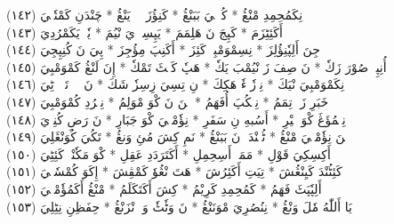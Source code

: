 \documentclass[a4paper, 10pt]{report}
\begin{document}
\begin{center}
\textarabic{(١٤٢) \textcolor{mygreen}{نِكَمُحِمِدِ مْنْڠُ  * كُنٖٹٖيَ بَبَنْڠُ  * كَنِؤُزَ پٖٹٖ يَنْڠُ  * چَنْدَنِ كَمْتٗلٖيَ }} 
\\[5mm] 

\textarabic{(١٤٣) \textcolor{mygreen}{پٖٹٖ أَكَئِٹِزَمَ  * كَپِجَ نَ هَلِمَمَ  * يَپِسِيٖ يَ نْيُمَ  * يٗتٖ يَكَمْرُدِيَ }} 
\\[5mm] 

\textarabic{(١٤٤) \textcolor{mygreen}{جِنَ أَلِپٗنِؤُلِزَ  * نِسِمْوَمْبِيٖ كَئِزَ  * أَكَنِپَ مِؤُجِزَ  * پِيَ نَ كُنِپِجِيَ }} 
\\[5mm] 

\textarabic{(١٤٥) \textcolor{mygreen}{أُنِپِيٖ صُوْرَ زَكٗ  * نَ صِفَ زَ نْيُمْبَ يَكٗ  * هَپٗ كَئٖٹَ تَمْكٗ  * إِنَ لَنْڠُ كَمْوَمْبِيَ }} 
\\[5mm] 

\textarabic{(١٤٦) \textcolor{mygreen}{نِكَمْوَمْبِيَ نْيَكَ  * نِزٖزٗوٖءٗ هَكِكَ  * نِ تِسِيَ زِسِزٗ شَكَ  * نَ وٖوٖ تَرٖهٖ ٹِيَ }} 
\\[5mm] 

\textarabic{(١٤٧) \textcolor{mygreen}{خَبَرِ زَكٖ تِمَمُ  * نِمٖكُپَ أُفَهَمُ  * تٖنَ نَ كْوَ مْوَلِمُ  * نِمٖرُدِ كُمْوَمْبِيَ }} 
\\[5mm] 

\textarabic{(١٤٨) \textcolor{mygreen}{نِمٖمُؤَڠَ كْوَ خٖيْرِ  * أَسُبهِ نِ سَفَرِ  * نِؤٗمْبٖيَ كْوَ جَبَارِ  * نَ رَضِ كُنِوٖيَ }} 
\\[5mm] 

\textarabic{(١٤٩) \textcolor{mygreen}{تٖنَ نِؤٗمْبٖيَ مْنْڠُ  * ٹُپٖنْدَنٖ نَ بَبَنْڠُ  * نَمِ كِشَ مُئِ وَنڠُ  * تَكُيَ كُوَنْڠَلِيَ }} 
\\[5mm] 

\textarabic{(١٥٠) \textcolor{mygreen}{أَكِسِكِيَ قَوْلِ  * مَمَكٖ أَسِحِمِلِ  * أَكَتَرَدَدِ عَقِلِ  * كْوَ مَكٗنْدٖ كَئِٹِيَ }} 
\\[5mm] 

\textarabic{(١٥١) \textcolor{mygreen}{كَئِٹُنْدَ كَيِنْڠُشَ  * تِيَتِ أَكَئِرُشَ  * هَتَ نْڠُوٗ كَمْڤِشَ  * إِكَوَ كُمْسٗمٖيَ }} 
\\[5mm] 

\textarabic{(١٥٢) \textcolor{mygreen}{أَلِپٗپَٹَ فَهَمُ  * كَمُحِمِدِ كَرِيْمُ  * كِشَ أَكَتَكَلَمُ  * مْنْڠُ أَكَمُؤٗمْبٖيَ }} 
\\[5mm] 

\textarabic{(١٥٣) \textcolor{mygreen}{يَا أَللّٰهُ مٗلَ وَنْڠُ  * نِنُصُرِيَ مْوَنَنْڠُ  * نَ وَٹٗٹٗ وَ وٖنْزَنْڠُ  * حِفَظِنِ نِٹِلِيَ }} 
\\[5mm] 


\end{center}
\end{document}
